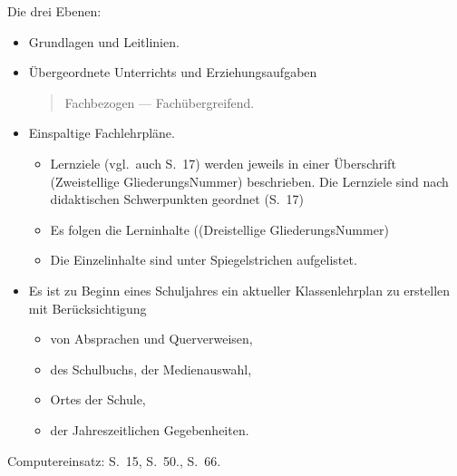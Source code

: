 \mip
{} 

Die drei Ebenen:
\begin{itemize}
	\item
	Grundlagen und Leitlinien.
	\item
	\"{U}bergeordnete Unterrichts und Erziehungsaufgaben
	\begin{quote}
		Fachbezogen --- Fach\"{u}bergreifend.
	\end{quote}
	\item
	Einspaltige Fachlehrpl\"{a}ne.
	\begin{itemize}
		\item
		Lernziele (vgl.\ auch S.\ 17) werden jeweils in
		einer \"{U}berschrift (Zweistellige GliederungsNummer) beschrieben.
		Die Lernziele sind nach didaktischen Schwerpunkten geordnet (S.\ 17)
		\item
		Es folgen die Lerninhalte ((Dreistellige GliederungsNummer)
		\item
		Die Einzelinhalte sind unter Spiegelstrichen aufgelistet.
	\end{itemize}
	\item
	Es ist zu Beginn eines Schuljahres ein aktueller
	Klassenlehrplan zu erstellen mit Ber\"{u}cksichtigung
	\begin{itemize}
		\item
		von Absprachen und Querverweisen,
		\item
		des Schulbuchs, der Medienauswahl,
		\item
		Ortes der Schule,
		\item
		der Jahreszeitlichen Gegebenheiten.
	\end{itemize}

\end{itemize}

Computereinsatz: S.\ 15, S.\ 50., S.\ 66.
